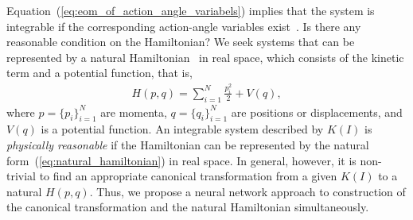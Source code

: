 Equation~(\ref{eq:eom_of_action_angle_variabels}) implies that the system is integrable if the corresponding action-angle variables exist~\cite{Arnold-text}.
Is there any reasonable condition on the Hamiltonian? We seek systems that can be represented by a natural Hamiltonian~\cite{Cariglia-2014} in real space, which consists of the kinetic term and a potential function, that is,
\begin{align}
  H(p,q) = \sum_{i=1}^{N}\frac{p_i^2}{2} + V(q),\label{eq:natural_hamiltonian}
\end{align}
where $p=\{p_i\}_{i=1}^{N}$ are momenta, $q=\{q_i\}_{i=1}^{N}$ are positions or displacements, and $V(q)$ is a potential function.
An integrable system described by $K(I)$ is {\em physically reasonable} if the Hamiltonian can be represented by the natural form~(\ref{eq:natural_hamiltonian}) in real space.
In general, however, it is non-trivial to find an appropriate canonical transformation from a given $K(I)$ to a natural $H(p,q)$.
Thus, we propose a neural network approach to construction of the canonical transformation and the natural Hamiltonian simultaneously.
